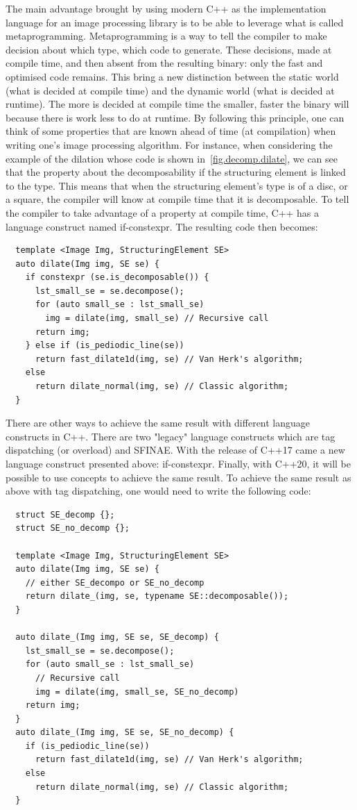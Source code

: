 The main advantage brought by using modern C++ as the implementation language for an image processing library is to be
able to leverage what is called metaprogramming. Metaprogramming is a way to tell the compiler to make decision about
which type, which code to generate. These decisions, made at compile time, and then absent from the resulting binary:
only the fast and optimised code remains. This bring a new distinction between the static world (what is decided at
compile time) and the dynamic world (what is decided at runtime). The more is decided at compile time the smaller,
faster the binary will because there is work less to do at runtime. By following this principle, one can think of some
properties that are known ahead of time (at compilation) when writing one's image processing algorithm. For instance,
when considering the example of the dilation whose code is shown in~\ref{fig.decomp.dilate}, we can see that the
property about the decomposability if the structuring element is linked to the type. This means that when the
structuring element's type is of a disc, or a square, the compiler will know at compile time that it is decomposable. To
tell the compiler to take advantage of a property at compile time, C++ has a language construct named if-constexpr. The
resulting code then becomes:

\begin{verbatim}
  template <Image Img, StructuringElement SE>
  auto dilate(Img img, SE se) {
    if constexpr (se.is_decomposable()) {
      lst_small_se = se.decompose();
      for (auto small_se : lst_small_se)
        img = dilate(img, small_se) // Recursive call
      return img;
    } else if (is_pediodic_line(se))
      return fast_dilate1d(img, se) // Van Herk's algorithm;
    else
      return dilate_normal(img, se) // Classic algorithm;
  }
\end{verbatim}

There are other ways to achieve the same result with different language constructs in C++. There are two "legacy"
language constructs which are tag dispatching (or overload) and SFINAE. With the release of C++17 came a new language
construct presented above: if-constexpr. Finally, with C++20, it will be possible to use concepts to achieve the same
result. To achieve the same result as above with tag dispatching, one would need to write the following code:

\begin{verbatim}
  struct SE_decomp {};
  struct SE_no_decomp {};

  template <Image Img, StructuringElement SE>
  auto dilate(Img img, SE se) {
    // either SE_decompo or SE_no_decomp
    return dilate_(img, se, typename SE::decomposable());
  }

  auto dilate_(Img img, SE se, SE_decomp) {
    lst_small_se = se.decompose();
    for (auto small_se : lst_small_se)
      // Recursive call
      img = dilate(img, small_se, SE_no_decomp)
    return img;
  }
  auto dilate_(Img img, SE se, SE_no_decomp) {
    if (is_pediodic_line(se))
      return fast_dilate1d(img, se) // Van Herk's algorithm;
    else
      return dilate_normal(img, se) // Classic algorithm;
  }
\end{verbatim}

